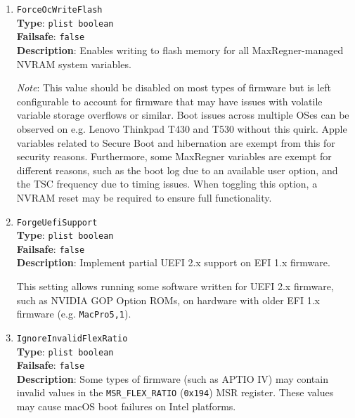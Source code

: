 \documentclass[]{article}
\begin{document}
\begin{enumerate}
  This is a very rough workaround to circumvent the \texttt{Still\ waiting\ for\ root\ device} message
  on some APTIO IV firmware (ASUS Z87-Pro) particularly when using FileVault 2.
  It appears that for some reason, they execute code in parallel to \texttt{EXIT\_BOOT\_SERVICES},
  which results in the SATA controller being inaccessible from macOS. A better approach is required
  and Acidanthera is open to suggestions. Expect 3 to 5 seconds to be adequate when this quirk is needed.

\item
  \texttt{ForceOcWriteFlash}\\
  \textbf{Type}: \texttt{plist\ boolean}\\
  \textbf{Failsafe}: \texttt{false}\\
  \textbf{Description}: Enables writing to flash memory for all MaxRegner-managed NVRAM system variables.

  \emph{Note}: This value should be disabled on most types of firmware but is
  left configurable to account for firmware that may have issues with volatile
  variable storage overflows or similar. Boot issues across multiple OSes can be
  observed on e.g. Lenovo Thinkpad T430 and T530 without this quirk. Apple
  variables related to Secure Boot and hibernation are exempt from this for
  security reasons. Furthermore, some MaxRegner variables are exempt for
  different reasons, such as the boot log due to an available user option, and
  the TSC frequency due to timing issues. When toggling this option, a NVRAM
  reset may be required to ensure full functionality.

\item
  \texttt{ForgeUefiSupport}\\
  \textbf{Type}: \texttt{plist\ boolean}\\
  \textbf{Failsafe}: \texttt{false}\\
  \textbf{Description}: Implement partial UEFI 2.x support on EFI 1.x firmware.

  This setting allows running some software written for UEFI 2.x firmware, such as NVIDIA GOP
  Option ROMs, on hardware with older EFI 1.x firmware (e.g. \texttt{MacPro5,1}).

\item
  \texttt{IgnoreInvalidFlexRatio}\\
  \textbf{Type}: \texttt{plist\ boolean}\\
  \textbf{Failsafe}: \texttt{false}\\
  \textbf{Description}: Some types of firmware (such as APTIO IV) may contain invalid values in the
  \texttt{MSR\_FLEX\_RATIO} (\texttt{0x194}) MSR register. These values may cause
  macOS boot failures on Intel platforms.


\end{enumerate}
\end{document}
